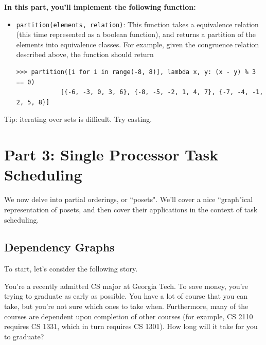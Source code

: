 \documentclass{article}
\begin{document}
    \vspace{3mm}
    \begin{tcolorbox}[colback=yellow!30]
        \textbf{In this part, you'll implement the following function:}
        \begin{itemize}
            \item \lstinline{partition(elements, relation)}: This function takes a equivalence relation (this time represented as a boolean function), and returns a partition of the elements into equivalence classes. For example, given the congruence relation described above, the function should return
        \begin{lstlisting}[belowskip=-10pt]
            >>> partition([i for i in range(-8, 8)], lambda x, y: (x - y) % 3 == 0)
            [{-6, -3, 0, 3, 6}, {-8, -5, -2, 1, 4, 7}, {-7, -4, -1, 2, 5, 8}]
        \end{lstlisting}

        \end{itemize}

        Tip: iterating over sets is difficult. Try casting.
    \end{tcolorbox}


\section*{Part 3: Single Processor Task Scheduling}

    We now delve into partial orderings, or ``posets". We'll cover a nice ``graph"ical representation of posets, and then cover their applications in the context of task scheduling. 
    

    \subsection*{Dependency Graphs}
    
    To start, let's consider the following story. 

    \begin{tcolorbox}[colback=red!10]
        You're a recently admitted CS major at Georgia Tech. To save money, you're trying to graduate as early as possible.  You have a lot of course that you can take, but you're not sure which ones to take when. Furthermore, many of the courses are dependent upon completion of other courses (for example, CS 2110 requires CS 1331, which in turn requires CS 1301). How long will it take for you to graduate?
    \end{tcolorbox}
\end{document}
